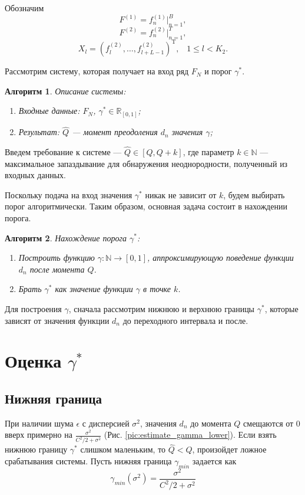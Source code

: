 \documentclass[specialist, substylefile = spbu.rtx,
			   subf, href, 12pt]{disser}
\newtheorem{algorithm}{Алгоритм}
\begin{document}
Обозначим
$$ F^{(1)} = f_n^{(1)}|_{n=1}^{B}, $$
$$ F^{(2)} = f_n^{(2)}|_{n=1}^{T}, $$
$$ X_l = (f_{l}^{(2)}, \dotsc, f_{l+L-1}^{(2)})^\mathrm{T}, \;\;\; 1 \leq l < K_2. $$

Рассмотрим систему, которая получает на вход ряд $ F_N $ и порог $ \gamma^* $.

\begin{algorithm}\label{algo:system_works}
	Описание системы:
	\begin{enumerate}
		\item Входные данные: $ F_N $, $ \gamma^* \in \mathbb{R}_{[0, 1]} $;
		\item Результат: $\hat{Q}$ --- момент преодоления $ d_n $ значения $ \gamma $;
		\end{enumerate}
\end{algorithm}

Введем требование к системе --- $ \hat{Q} \in [Q, Q+k] $, где параметр $ k \in \mathbb{N} $ --- максимальное запаздывание для обнаружения неоднородности, полученный из входных данных. 

Поскольку подача на вход значения $ \gamma^* $ никак не зависит от $ k $, будем выбирать порог алгоритмически. Таким образом, основная задача состоит в нахождении порога. 
\begin{algorithm}\label{algo:fix_gamma}
	Нахождение порога $ \gamma^* $:
	\begin{enumerate}
		\item Построить функцию $ \gamma: \mathbb{N} \rightarrow [0, 1] $, аппроксимирующую поведение функции $ d_n $ после момента $ Q $.
		\item Брать $ \gamma^* $ как значение функции $ \gamma $ в точке $ k $.
	\end{enumerate}
\end{algorithm}

Для построения $ \gamma $, сначала рассмотрим нижнюю и верхнюю границы $ \gamma^* $, которые зависят от значения функции $ d_n $ до переходного интервала и после.

\section{Оценка $ \gamma^* $}
\subsection{Нижняя граница}\label{ch:lower_border}

При наличии шума $ \epsilon $ с дисперсией $ \sigma^2 $, значения $ d_n $ до момента $ Q $ смещаются от $ 0 $ вверх примерно на $ \frac{\sigma^2}{C^2/2 + \sigma^2} $ (Рис. \ref{pic:estimate_gamma_lower}). Если взять нижнюю границу $ \gamma^* $ слишком маленьким, то $ \hat{Q} < Q $, произойдет ложное срабатывания системы. Пусть нижняя граница $ \gamma_{min} $ задается как
\begin{equation}\label{eq:gamma_min}
	\gamma_{min}(\sigma^2) = \frac{\sigma^2}{C^2/2 + \sigma^2}
\end{equation}
\end{document}
